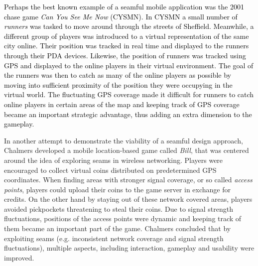 \documentclass[prodmode,acmtomm]{acmsmall}
\begin{document}
\textcolor{black}{Perhaps the best known example of a seamful mobile application was the 2001 chase game \textit{Can You See Me Now} (CYSMN).\cite{benford2006} In CYSMN a small number of \textit{runners} was tasked to move around through the streets of Sheffield. Meanwhile, a different group of players was introduced to a virtual representation of the same city online. Their position was tracked in real time and displayed to the runners through their PDA devices. Likewise, the position of runners was tracked using GPS and displayed to the online players in their virtual environment. The goal of the runners was then to catch as many of the online players as possible by moving into sufficient proximity of the position they were occupying in the virtual world. The fluctuating GPS coverage made it difficult for runners to catch online players in certain areas of the map and keeping track of GPS coverage became an important strategic advantage, thus adding an extra dimension to the gameplay.}

In another attempt to demonstrate the viability of a seamful design approach, Chalmers \cite{chalmers2003} developed a mobile location-based game called \textit{Bill}, that was centered around the idea of exploring seams in wireless networking. Players were encouraged to collect virtual coins distributed on predetermined GPS coordinates. When finding areas with stronger signal coverage, or so called \textit{access points}, players could upload their coins to the game server in exchange for credits. On the other hand by staying out of these network covered areas, players avoided pickpockets threatening to steal their coins. Due to signal strength fluctuations, positions of the access points were dynamic and keeping track of them became an important part of the game. Chalmers concluded that by exploiting seams (e.g. inconsistent network coverage and signal strength fluctuations), multiple aspects, including interaction, gameplay and usability were improved. 
\end{document}
